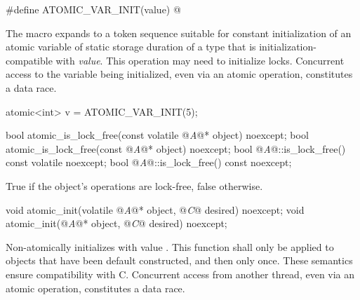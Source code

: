 \begin{itemdecl}
#define ATOMIC_VAR_INIT(value) @\seebelow@
\end{itemdecl}

\begin{itemdescr}
\pnum
The macro expands to a token sequence suitable for
constant initialization of
an atomic variable of static storage duration of a type that is
initialization-compatible with \textit{value}.
\enternote This operation may need to initialize locks. \exitnote
Concurrent access to the variable being initialized, even via an atomic operation,
constitutes a data race. \enterexample
\begin{codeblock}
atomic<int> v = ATOMIC_VAR_INIT(5);
\end{codeblock}
\exitexample
\end{itemdescr}

%
%
\begin{itemdecl}
bool atomic_is_lock_free(const volatile @\textit{A}@* object) noexcept;
bool atomic_is_lock_free(const @\textit{A}@* object) noexcept;
bool @\textit{A}@::is_lock_free() const volatile noexcept;
bool @\textit{A}@::is_lock_free() const noexcept;
\end{itemdecl}

\begin{itemdescr}
\pnum
\returns True if the object's operations are lock-free, false otherwise.
\end{itemdescr}

\begin{itemdecl}
void atomic_init(volatile @\textit{A}@* object, @\textit{C}@ desired) noexcept;
void atomic_init(@\textit{A}@* object, @\textit{C}@ desired) noexcept;
\end{itemdecl}

\begin{itemdescr}
\pnum
\effects Non-atomically
initializes  with value . This function shall only be applied
to objects that have been default constructed, and then only once.
\enternote
These semantics ensure compatibility with C.
\exitnote
\enternote
Concurrent access from another thread, even via an atomic operation, constitutes
a data race.
\exitnote

\end{itemdescr}

